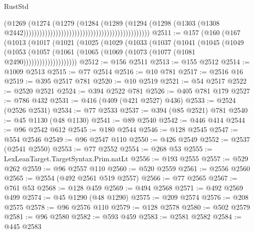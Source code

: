\begin{lexlean}{RustStd}
\begin{coremodule}
                                                                                (@1269
                                                                                  (@1274
                                                                                    (@1279
                                                                                      (@1284
                                                                                        (@1289
                                                                                          (@1294
                                                                                            (@1298
                                                                                              (@1303
                                                                                                (@1308
                                                                                                  @2442)))))))))))))))))))))))))))))))))))))))))))))))
@2511 := @157
    (@160
      (@167
        (@1013
          (@1017
            (@1021
              (@1025
                (@1029
                  (@1033
                    (@1037
                      (@1041
                        (@1045
                          (@1049
                            (@1053
                              (@1057
                                (@1061 (@1065 (@1069 (@1073 (@1077 (@1081 @2490))))))))))))))))))))
@2512 := @156 @2511
@2513 := @155 @2512
@2514 := @1009 @2513
@2515 := @77 @2514
@2516 := @10 @781
@2517 := @2516 @16
@2519 := @395 @2517 @781
@2520 := @10 @2519
@2521 := @54 @2517
@2522 := @2520 @2521
@2524 := @394 @2522 @781
@2526 := @405 @781 @179
@2527 := @786 @432
@2531 := @416 (@409 (@421 @2527) @436)
@2533 := @2524 (@2526 @2531)
@2534 := @77 @2533
@2537 := @394 (@85 @2521) @781
@2540 := @45 @1130 (@48 @1130)
@2541 := @89 @2540
@2542 := @446 @414
@2544 := @96 @2542 @612
@2545 := @180 @2544
@2546 := @128 @2545
@2547 := @554 @2546
@2549 := @96 @2547 @110
@2550 := @426 @2549
@2552 := @2537 (@2541 @2550)
@2553 := @77 @2552
@2554 := @268 @53
@2555 := LexLeanTarget.TargetSyntax.Prim.natLt
@2556 := @193 @2555
@2557 := @529 @262
@2559 := @96 @2557 @110
@2560 := @520 @2559
@2561 := @2556 @2560
@2565 := @2554 (@492 @2561 @519 @2557)
@2566 := @77 @2565
@2567 := @761 @53
@2568 := @128 @459
@2569 := @494 @2568
@2571 := @492 @2569 @499
@2574 := @45 @1290 (@48 @1290)
@2575 := @209 @2574
@2576 := @208 @2575
@2578 := @96 @2576 @110
@2579 := @128 @2578
@2580 := @502 @2579
@2581 := @96 @2580
@2582 := @593 @459
@2583 := @2581 @2582
@2584 := @445 @2583

\end{coremodule}
\end{lexlean}
